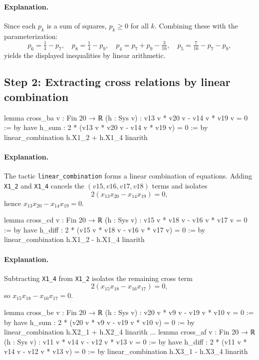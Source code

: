 \documentclass[11pt]{article}
\begin{document}
\paragraph{Explanation.}
Since each $p_k$ is a sum of squares, $p_k\ge 0$ for all $k$.
Combining these with the parameterization:
\[
p_6=\tfrac14-p_7,\quad p_8=\tfrac14-p_9,\quad p_4=p_7+p_9-\tfrac3{16},\quad p_5=\tfrac7{16}-p_7-p_9,
\]
yields the displayed inequalities by linear arithmetic.

\subsection*{Step 2: Extracting cross relations by linear combination}

\begin{LeanCode}
lemma cross_ba {v : Fin 20 → ℝ} (h : Sys v) : v13 v * v20 v - v14 v * v19 v = 0 := by
  have h_sum : 2 * (v13 v * v20 v - v14 v * v19 v) = 0 := by
    linear_combination h.X1_2 + h.X1_4
  linarith
\end{LeanCode}

\paragraph{Explanation.}
The tactic \texttt{linear\_combination} forms a linear combination of equations.  Adding \texttt{X1\_2} and \texttt{X1\_4} cancels the $(v15,v16,v17,v18)$ terms and isolates
\[
2(x_{13}x_{20}-x_{14}x_{19})=0,
\]
hence $x_{13}x_{20}-x_{14}x_{19}=0$.

\begin{LeanCode}
lemma cross_cd {v : Fin 20 → ℝ} (h : Sys v) : v15 v * v18 v - v16 v * v17 v = 0 := by
  have h_diff : 2 * (v15 v * v18 v - v16 v * v17 v) = 0 := by
    linear_combination h.X1_2 - h.X1_4
  linarith
\end{LeanCode}

\paragraph{Explanation.}
Subtracting \texttt{X1\_4} from \texttt{X1\_2} isolates the remaining cross term
\[
2(x_{15}x_{18}-x_{16}x_{17})=0,
\]
so $x_{15}x_{18}-x_{16}x_{17}=0$.

\begin{LeanCode}
lemma cross_be {v : Fin 20 → ℝ} (h : Sys v) : v20 v * v9 v - v19 v * v10 v = 0 := by
  have h_sum : 2 * (v20 v * v9 v - v19 v * v10 v) = 0 := by
    linear_combination h.X2_1 + h.X2_4
  linarith
...
lemma cross_af {v : Fin 20 → ℝ} (h : Sys v) : v11 v * v14 v - v12 v * v13 v = 0 := by
  have h_diff : 2 * (v11 v * v14 v - v12 v * v13 v) = 0 := by
    linear_combination h.X3_1 - h.X3_4
  linarith
\end{LeanCode}
\end{document}
